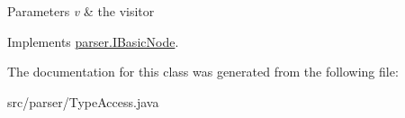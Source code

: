 \begin{DoxyParams}{Parameters}
{\em v} & the visitor \\
\hline
\end{DoxyParams}


Implements \hyperlink{interfaceparser_1_1_i_basic_node_af8790b7076c59e00781ba3d4118757cd}{parser.\+I\+Basic\+Node}.



The documentation for this class was generated from the following file\+:\begin{DoxyCompactItemize}
\item 
src/parser/Type\+Access.\+java\end{DoxyCompactItemize}
